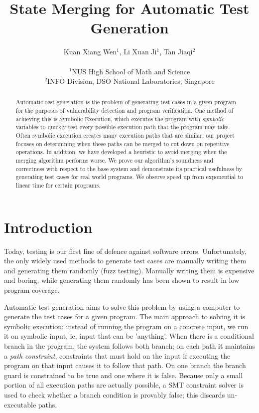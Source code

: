 \documentclass[12pt,a4paper]{article}
\title{State Merging for Automatic Test Generation}
\date{}
\author{
Kuan Xiang Wen$^{1}$, Li Xuan Ji$^{1}$, Tan Jiaqi$^{2}$\\
\vspace{1 mm} \\
\small{$^{1}$NUS High School of Math and Science}\\
\small{$^{2}$INFO Division, DSO National Laboratories, Singapore}
}
\begin{document}
\begin{abstract}
Automatic test generation is the problem of generating test cases in a given program for the purposes of vulnerability detection and program verification. One method of achieving this is Symbolic Execution, which executes the program with \emph{symbolic} variables to quickly test every possible execution path that the program may take. Often symbolic execution creates many execution paths that are similar; our project focuses on determining when these paths can be merged to cut down on repetitive operations. In addition, we have developed a heuristic to avoid merging when the merging algorithm performs worse. We prove our algorithm's soundness and correctness with respect to the base system and demonstrate its practical usefulness by generating test cases for real world programs. We observe speed up from exponential to linear time for certain programs.
\end{abstract}

\section{Introduction}
Today, testing is our first line of defence against software errors. Unfortunately, the only widely used methods to generate test cases are manually writing them and generating them randomly (fuzz testing). Manually writing them is expensive and boring, while generating them randomly has been shown to result in low program coverage. 

Automatic test generation aims to solve this problem by using a computer to generate the test cases for a given program. The main approach to solving it is symbolic execution: instead of running the program on a concrete input, we run it on symbolic input, ie, input that can be 'anything'. When there is a conditional branch in the program, the system follows both branch; on each path it maintains a \emph{path constraint}, constraints that must hold on the input if executing the program on that input causes it to follow that path. On one branch the branch guard is constrained to be true and one where it is false. Because only a small portion of all execution paths are actually possible, a SMT constraint solver is used to check whether a branch condition is provably false; this discards un-executable paths.
\end{document}
